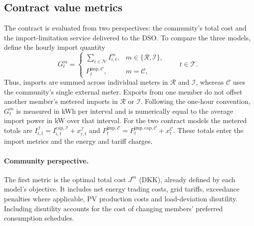 \subsection{Contract value metrics}
\label{sec:q1-contract-value-metrics}

The contract is evaluated from two perspectives: the community's total
cost and the import-limitation service delivered to the DSO. To compare
the three models, define the hourly import quantity
\begin{equation}
G_t^m =
\begin{cases}
\displaystyle\sum_{i\in\mathcal N} I_{i,t}^m,
    & m\in\{\mathcal R,\mathcal I\},\\[4pt]
P_t^{\mathrm{imp},\mathcal C},
    & m=\mathcal C,
\end{cases}
\qquad t\in\mathcal T.
\label{eq:q1-metrics-import}
\end{equation}
Thus, imports are summed across individual meters in $\mathcal R$ and
$\mathcal I$, whereas $\mathcal C$ uses the community's single external
meter. Exports from one member do not offset another member's metered
imports in $\mathcal R$ or $\mathcal I$. Following the one-hour convention,
$G_t^m$ is measured in kWh per interval and is numerically equal to the
average import power in kW over that interval.
For the two contract models the metered totals are
$I_{i,t}^{\mathcal I}=I_{i,t}^{\mathrm{cap},\mathcal I}+x_{i,t}^{\mathcal I}$
and
$P_t^{\mathrm{imp},\mathcal C}=P_t^{\mathrm{imp,cap},\mathcal C}
+x_t^{\mathcal C}$. These totals enter the import metrics and the
energy and tariff charges.

\paragraph{Community perspective.}
The first metric is the optimal total cost $J^m$ (DKK), already defined
by each model's objective. It includes net energy trading costs, grid
tariffs, exceedance penalties where applicable, PV production costs and
load-deviation disutility. Including disutility accounts for the cost
of changing members' preferred consumption schedules.

